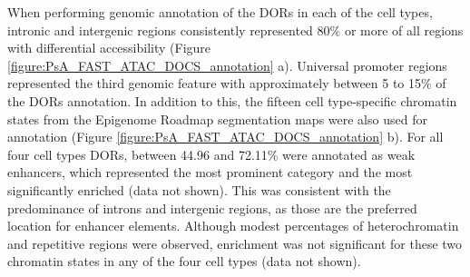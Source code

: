 When performing genomic annotation of the DORs in each of the cell types, intronic and intergenic regions consistently represented 80\% or more of all regions with differential accessibility (Figure \ref{figure:PsA_FAST_ATAC_DOCS_annotation} a). Universal promoter regions represented the third genomic feature with approximately between 5 to 15\% of the DORs annotation. In addition to this, the fifteen cell type-specific chromatin states from the Epigenome Roadmap segmentation maps were also used for annotation (Figure \ref{figure:PsA_FAST_ATAC_DOCS_annotation} b). For all four cell types DORs, between 44.96 and 72.11\% were annotated as weak enhancers, which represented the most prominent category and the most significantly enriched (data not shown). This was consistent with the predominance of introns and intergenic regions, as those are the preferred location for enhancer elements. Although modest percentages of heterochromatin and repetitive regions were observed, enrichment was not significant for these two chromatin states in any of the four cell types (data not shown).
%

